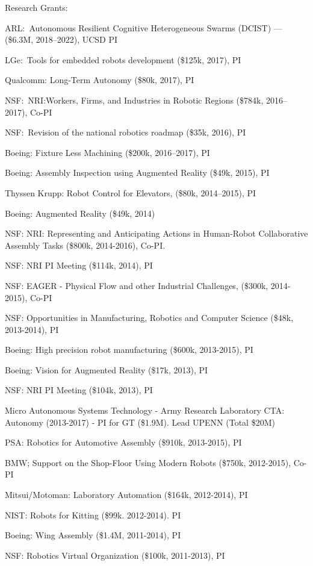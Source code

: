 \documentclass{article}
\begin{document}
\begin{cv}
\begin{cvlist}{Research Grants:}
\item ARL:\ Autonomous Resilient Cognitive Heterogeneous Swarms
  (DCIST) --- (\$6.3M, 2018--2022), UCSD PI
\item LGe:\ Tools for embedded robots development (\$125k, 2017), PI
\item Qualcomm: Long-Term Autonomy (\$80k, 2017), PI
\item NSF:\ NRI:Workers, Firms, and Industries in Robotic Regions
  (\$784k, 2016--2017), Co-PI
\item NSF:\ Revision of the national robotics roadmap (\$35k, 2016), PI
\item Boeing: Fixture Less Machining (\$200k, 2016--2017), PI
\item Boeing: Assembly Inspection using Augmented Reality (\$49k,
  2015), PI
\item Thyssen Krupp: Robot Control for Elevators, (\$80k, 2014--2015), PI
\item Boeing: Augmented Reality (\$49k, 2014)
\item NSF: NRI: Representing and Anticipating Actions in Human-Robot
  Collaborative Assembly Tasks (\$800k, 2014-2016), Co-PI.
\item NSF: NRI PI Meeting (\$114k, 2014), PI
\item NSF: EAGER - Physical Flow and other Industrial Challenges,
  (\$300k, 2014-2015), Co-PI
\item NSF: Opportunities in Manufacturing, Robotics and Computer Science
  (\$48k, 2013-2014), PI
\item Boeing: High precision robot manufacturing (\$600k, 2013-2015), PI
\item Boeing: Vision for Augmented Reality (\$17k, 2013), PI
\item NSF: NRI PI Meeting (\$104k, 2013), PI
\item Micro Autonomous Systems Technology - Army Research Laboratory
  CTA: Autonomy (2013-2017) - PI for GT (\$1.9M). Lead UPENN (Total
  \$20M) %
\item PSA: Robotics for Automotive Assembly (\$910k, 2013-2015), PI
\item BMW; Support on the Shop-Floor Using Modern Robots (\$750k,
  2012-2015), Co-PI
\item Mitsui/Motoman: Laboratory Automation (\$164k, 2012-2014), PI
\item NIST: Robots for Kitting (\$99k. 2012-2014). PI
\item Boeing: Wing Assembly (\$1.4M, 2011-2014), PI
\item NSF: Robotics Virtual Organization (\$100k, 2011-2013), PI

\end{cvlist}
\end{cv}
\end{document}
